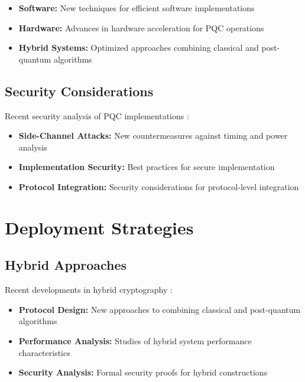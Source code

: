 \begin{itemize}
    \item \textbf{Software:} New techniques for efficient software implementations \parencite{software_optimization_2024}
    \item \textbf{Hardware:} Advances in hardware acceleration for PQC operations \parencite{hardware_acceleration_2024}
    \item \textbf{Hybrid Systems:} Optimized approaches combining classical and post-quantum algorithms \parencite{hybrid_systems_2024}
\end{itemize}

\subsection{Security Considerations}
Recent security analysis of PQC implementations \parencite{pqc_security_2024}:

\begin{itemize}
    \item \textbf{Side-Channel Attacks:} New countermeasures against timing and power analysis \parencite{side_channel_2024}
    \item \textbf{Implementation Security:} Best practices for secure implementation \parencite{implementation_security_2024}
    \item \textbf{Protocol Integration:} Security considerations for protocol-level integration \parencite{protocol_security_2024}
\end{itemize}

\section{Deployment Strategies}

\subsection{Hybrid Approaches}
Recent developments in hybrid cryptography \parencite{hybrid_crypto_2024}:

\begin{itemize}
    \item \textbf{Protocol Design:} New approaches to combining classical and post-quantum algorithms \parencite{hybrid_protocols_2024}
    \item \textbf{Performance Analysis:} Studies of hybrid system performance characteristics \parencite{hybrid_performance_2024}
    \item \textbf{Security Analysis:} Formal security proofs for hybrid constructions \parencite{hybrid_security_2024}
\end{itemize}

